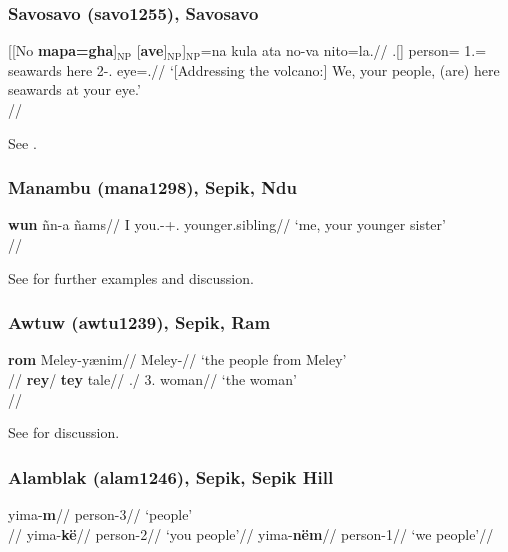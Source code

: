 \documentclass[A4paper]{article}
\newcommand{\unt}[1]{\hbox{}$_\text{#1}$}
\begin{document}
\subsubsection{Savosavo (savo1255), Savosavo}

\ex \begingl
\gla {}[[No \textbf{mapa=gha}]\unt{NP} [\textbf{ave}]\unt{NP}]\unt{NP}=na kula ata no-va nito=la.//
\Sg.[\Gen] person=\Pl{} 1\Pl.\Excl=\Nom{} seawards here 2\Sg-\Gen.\M{} eye=\Loc.\M{}//
\glft `[Addressing the volcano:] We, your people, (are) here seawards at your eye.'\\\citep[155, (285)]{wegener2012}//
\endgl
\xe

See \citet[147,155--159]{wegener2012}.

\subsubsection{Manambu (mana1298), Sepik, Ndu}

\ex \begingl
\gla \textbf{wun} ñ\textschwa{}n-a ñam\textschwa{}s//
\glb I you.\F-\Lnk+\F.\Sg{} younger.sibling//
\glft `me, your younger sister'\\\citep[197]{aikhenvald2008}//
\endgl
\xe

See \citet[197f., 508--513]{aikhenvald2008} for further examples and discussion.

\subsubsection{Awtuw (awtu1239), Sepik, Ram}


\pex \a
\begingl
\gla \textbf{rom} Meley-y\ae{}nim//
\Pl{} Meley-\Generic{}//
\glft `the people from Meley' \\\citep[122, (15a)]{feldman1986}//
\endgl
\a 
\begingl
\gla \textbf{rey}/ \textbf{tey} tale//
\M.\Sg{}/ 3\F.\Sg{} woman//
\glft `the woman'\\\citep[123, (21a)]{feldman1986}//
\endgl
\xe

See \citet[120--124]{feldman1986} for discussion.

\newpage

\subsubsection{Alamblak (alam1246), Sepik, Sepik Hill}

\pex %
\vspace{-1.832\baselineskip}
\begin{multicols}{3}
\a
\begingl 
\gla yima-\textbf{m}//
\glb person-3\Pl{}//
\glft `people'\\\citep[96]{bruce1984}//
\endgl
\a
\begingl
\gla yima-\textbf{k\"{e}}//
\glb person-2\Pl{}//
\glft `you people'//
\endgl
\a
\begingl
\gla yima-\textbf{n\"em}//
\glb person-1\Pl{}//
\glft `we people'//
\endgl
\end{multicols}
\xe
\end{document}
